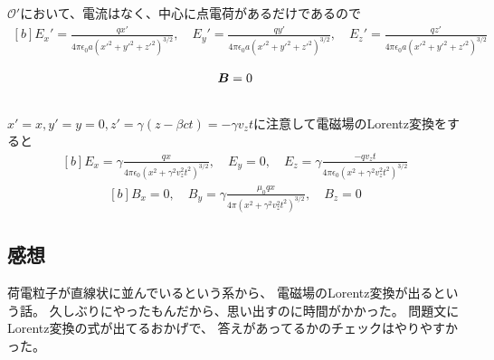 \documentclass[../../sp_2014.tex]{subfiles}
\begin{document}
\subsection{}
\(\mathcal{O}'\)において、電流はなく、中心に点電荷があるだけであるので
\begin{equation}\begin{aligned}[b]
    E_x' = \frac{qx'}{4\pi\epsilon_0a(x'^2+y'^2+z'^2)^{3/2}},\quad
    E_y' = \frac{qy'}{4\pi\epsilon_0a(x'^2+y'^2+z'^2)^{3/2}},\quad
    E_z' = \frac{qz'}{4\pi\epsilon_0a(x'^2+y'^2+z'^2)^{3/2}}\\
\end{aligned}\end{equation}
\begin{equation}\begin{aligned}[b]
    \vb*{B} = 0
\end{aligned}\end{equation}
\subsection{}
\(x'=x,y'=y=0,z'=\gamma(z-\beta ct)=-\gamma v_zt\)に注意して電磁場のLorentz変換をすると
\begin{equation}\begin{aligned}[b]
    E_x = \gamma\frac{qx}{4\pi\epsilon_0(x^2+\gamma^2v_z^2 t^2)^{3/2}},\quad
    E_y = 0,\quad
    E_z = \gamma\frac{-q v_z t}{4\pi\epsilon_0(x^2+\gamma^2v_z^2 t^2)^{3/2}}
\end{aligned}\end{equation}
\begin{equation}\begin{aligned}[b]
    B_x = 0,\quad
    B_y = \gamma\frac{\mu_0 q x}{4\pi(x^2+\gamma^2v_z^2t^2)^{3/2}},\quad
    B_z = 0
\end{aligned}\end{equation}


\subsection*{感想}
荷電粒子が直線状に並んでいるという系から、
電磁場のLorentz変換が出るという話。
久しぶりにやったもんだから、思い出すのに時間がかかった。
問題文にLorentz変換の式が出てるおかげで、
答えがあってるかのチェックはやりやすかった。
\end{document}
